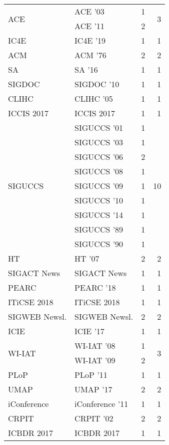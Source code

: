 \begin{table*}[t]
\begin{tabular}{llrr}
\multirow{2}{*}{ACE } & ACE '03 & 1 & \multirow{2}{*}{3}\\
& ACE '11 & 2 &\\
\multirow{1}{*}{IC4E } & IC4E '19 & 1 & \multirow{1}{*}{1}\\
\multirow{1}{*}{ACM } & ACM '76 & 2 & \multirow{1}{*}{2}\\
\multirow{1}{*}{SA } & SA '16 & 1 & \multirow{1}{*}{1}\\
\multirow{1}{*}{SIGDOC } & SIGDOC '10 & 1 & \multirow{1}{*}{1}\\
\multirow{1}{*}{CLIHC } & CLIHC '05 & 1 & \multirow{1}{*}{1}\\
\multirow{1}{*}{ICCIS 2017} & ICCIS 2017 & 1 & \multirow{1}{*}{1}\\
\multirow{9}{*}{SIGUCCS } & SIGUCCS '01 & 1 & \multirow{9}{*}{10}\\
& SIGUCCS '03 & 1 &\\
& SIGUCCS '06 & 2 &\\
& SIGUCCS '08 & 1 &\\
& SIGUCCS '09 & 1 &\\
& SIGUCCS '10 & 1 &\\
& SIGUCCS '14 & 1 &\\
& SIGUCCS '89 & 1 &\\
& SIGUCCS '90 & 1 &\\
\multirow{1}{*}{HT } & HT '07 & 2 & \multirow{1}{*}{2}\\
\multirow{1}{*}{SIGACT News} & SIGACT News & 1 & \multirow{1}{*}{1}\\
\multirow{1}{*}{PEARC } & PEARC '18 & 1 & \multirow{1}{*}{1}\\
\multirow{1}{*}{ITiCSE 2018} & ITiCSE 2018 & 1 & \multirow{1}{*}{1}\\
\multirow{1}{*}{SIGWEB Newsl.} & SIGWEB Newsl. & 2 & \multirow{1}{*}{2}\\
\multirow{1}{*}{ICIE } & ICIE '17 & 1 & \multirow{1}{*}{1}\\
\multirow{2}{*}{WI-IAT } & WI-IAT '08 & 1 & \multirow{2}{*}{3}\\
& WI-IAT '09 & 2 &\\
\multirow{1}{*}{PLoP } & PLoP '11 & 1 & \multirow{1}{*}{1}\\
\multirow{1}{*}{UMAP } & UMAP '17 & 2 & \multirow{1}{*}{2}\\
\multirow{1}{*}{iConference } & iConference '11 & 1 & \multirow{1}{*}{1}\\
\multirow{1}{*}{CRPIT } & CRPIT '02 & 2 & \multirow{1}{*}{2}\\
\multirow{1}{*}{ICBDR 2017} & ICBDR 2017 & 1 & \multirow{1}{*}{1}\\

\end{tabular}
\end{table*}
